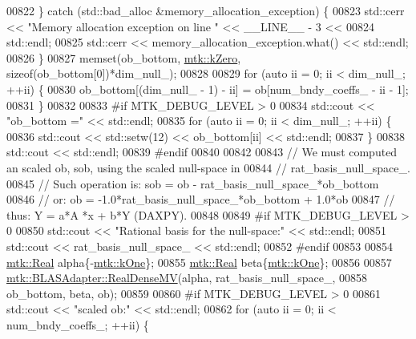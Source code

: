\begin{DoxyCode}
{{00822     \} \textcolor{keywordflow}{catch} (std::bad\_alloc &memory\_allocation\_exception) \{
00823       std::cerr << \textcolor{stringliteral}{"Memory allocation exception on line "} << \_\_LINE\_\_ - 3 <<
00824         std::endl;
00825       std::cerr << memory\_allocation\_exception.what() << std::endl;
00826     \}
00827     memset(ob\_bottom, \hyperlink{group__c01-roots_ga59a451a5fae30d59649bcda274fea271}{mtk::kZero}, \textcolor{keyword}{sizeof}(ob\_bottom[0])*dim\_null\_);
00828 
00829     \textcolor{keywordflow}{for} (\textcolor{keyword}{auto} ii = 0; ii < dim\_null\_; ++ii) \{
00830       ob\_bottom[(dim\_null\_ - 1) - ii] = ob[num\_bndy\_coeffs\_ - ii - 1];
00831     \}
00832 
00833 \textcolor{preprocessor}{    #if MTK\_DEBUG\_LEVEL > 0}
00834     std::cout << \textcolor{stringliteral}{"ob\_bottom ="} << std::endl;
00835     \textcolor{keywordflow}{for} (\textcolor{keyword}{auto} ii = 0; ii < dim\_null\_; ++ii) \{
00836       std::cout << std::setw(12) << ob\_bottom[ii] << std::endl;
00837     \}
00838     std::cout << std::endl;
00839 \textcolor{preprocessor}{    #endif}
00840 
00842 
00843     \textcolor{comment}{// We must computed an scaled ob, sob, using the scaled null-space in}
00844     \textcolor{comment}{// rat\_basis\_null\_space\_.}
00845     \textcolor{comment}{// Such operation is: sob = ob - rat\_basis\_null\_space\_*ob\_bottom}
00846     \textcolor{comment}{// or:                 ob = -1.0*rat\_basis\_null\_space\_*ob\_bottom + 1.0*ob}
00847     \textcolor{comment}{// thus:                Y =    a*A    *x         +   b*Y (DAXPY).}
00848 
00849 \textcolor{preprocessor}{    #if MTK\_DEBUG\_LEVEL > 0}
00850     std::cout << \textcolor{stringliteral}{"Rational basis for the null-space:"} << std::endl;
00851     std::cout << rat\_basis\_null\_space\_ << std::endl;
00852 \textcolor{preprocessor}{    #endif}
00853 
00854     \hyperlink{group__c01-roots_gac080bbbf5cbb5502c9f00405f894857d}{mtk::Real} alpha\{-\hyperlink{group__c01-roots_ga26407c24d43b6b95480943340d285c71}{mtk::kOne}\};
00855     \hyperlink{group__c01-roots_gac080bbbf5cbb5502c9f00405f894857d}{mtk::Real} beta\{\hyperlink{group__c01-roots_ga26407c24d43b6b95480943340d285c71}{mtk::kOne}\};
00856 
00857     \hyperlink{classmtk_1_1BLASAdapter_afdcac059a4294287cb55638221220646}{mtk::BLASAdapter::RealDenseMV}(alpha, rat\_basis\_null\_space\_,
00858                                   ob\_bottom, beta, ob);
00859 
00860 \textcolor{preprocessor}{    #if MTK\_DEBUG\_LEVEL > 0}
00861     std::cout << \textcolor{stringliteral}{"scaled ob:"} << std::endl;
00862     \textcolor{keywordflow}{for} (\textcolor{keyword}{auto} ii = 0; ii < num\_bndy\_coeffs\_; ++ii) \{
}}
\end{DoxyCode}
